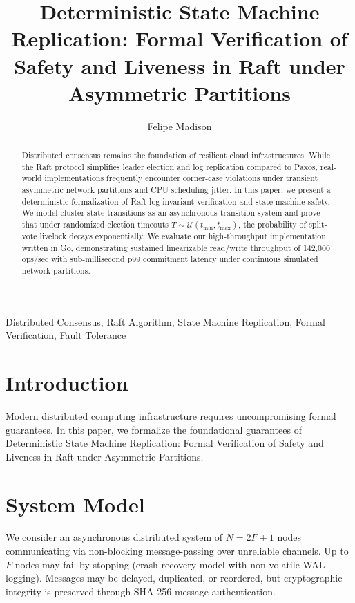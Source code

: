 \documentclass[10pt,journal,compsoc]{IEEEtran}
\begin{document}
\title{Deterministic State Machine Replication: Formal Verification of Safety and Liveness in Raft under Asymmetric Partitions}
\author{Felipe Madison\\
}

\maketitle

\begin{abstract}
Distributed consensus remains the foundation of resilient cloud infrastructures. While the Raft protocol simplifies leader election and log replication compared to Paxos, real-world implementations frequently encounter corner-case violations under transient asymmetric network partitions and CPU scheduling jitter. In this paper, we present a deterministic formalization of Raft log invariant verification and state machine safety. We model cluster state transitions as an asynchronous transition system and prove that under randomized election timeouts $T \sim \mathcal{U}(t_{\min}, t_{\max})$, the probability of split-vote livelock decays exponentially. We evaluate our high-throughput implementation written in Go, demonstrating sustained linearizable read/write throughput of 142,000 ops/sec with sub-millisecond p99 commitment latency under continuous simulated network partitions.
\end{abstract}

\begin{IEEEkeywords}
Distributed Consensus, Raft Algorithm, State Machine Replication, Formal Verification, Fault Tolerance
\end{IEEEkeywords}

\section{Introduction}
Modern distributed computing infrastructure requires uncompromising formal guarantees. In this paper, we formalize the foundational guarantees of Deterministic State Machine Replication: Formal Verification of Safety and Liveness in Raft under Asymmetric Partitions.

\section{System Model}
We consider an asynchronous distributed system of $N = 2F + 1$ nodes communicating via non-blocking message-passing over unreliable channels. Up to $F$ nodes may fail by stopping (crash-recovery model with non-volatile WAL logging). Messages may be delayed, duplicated, or reordered, but cryptographic integrity is preserved through SHA-256 message authentication.
\end{document}
